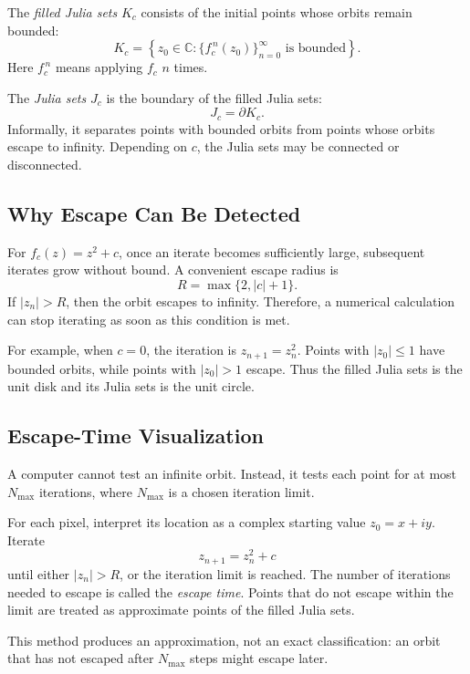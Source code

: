 \documentclass[a4paper, 10pt, onepage]{elegantbook}
\begin{document}
{The \emph{filled Julia sets} \(K_c\) consists of the initial points whose
orbits remain bounded:
\[
K_c=
\left\{z_0\in\mathbb{C}:
\bigl\{f_c^{\,n}(z_0)\bigr\}_{n=0}^{\infty}
\text{ is bounded}\right\}.
\]
Here \(f_c^{\,n}\) means applying \(f_c\) \(n\) times.

The \emph{Julia sets} \(J_c\) is the boundary of the filled Julia sets:
\[
J_c=\partial K_c.
\]
Informally, it separates points with bounded orbits from points whose
orbits escape to infinity. Depending on \(c\), the Julia sets may be
connected or disconnected.

\subsection{Why Escape Can Be Detected}

\noindent

For \(f_c(z)=z^2+c\), once an iterate becomes sufficiently large,
subsequent iterates grow without bound. A convenient escape radius is
\[
R=\max\{2,\lvert c\rvert+1\}.
\]
If \(\lvert z_n\rvert>R\), then the orbit escapes to infinity. Therefore,
a numerical calculation can stop iterating as soon as this condition is
met.

For example, when \(c=0\), the iteration is \(z_{n+1}=z_n^2\).
Points with \(\lvert z_0\rvert\leq 1\) have bounded orbits, while points
with \(\lvert z_0\rvert>1\) escape. Thus the filled Julia sets is the
unit disk and its Julia sets is the unit circle.

\subsection{Escape-Time Visualization}

A computer cannot test an infinite orbit. Instead, it tests each point
for at most \(N_{\max}\) iterations, where \(N_{\max}\) is a chosen
iteration limit.

For each pixel, interpret its location as a complex starting value
\(z_0=x+iy\). Iterate
\[
z_{n+1}=z_n^2+c
\]
until either \(\lvert z_n\rvert>R\), or the iteration limit is reached.
The number of iterations needed to escape is called the \emph{escape
time}. Points that do not escape within the limit are treated as
approximate points of the filled Julia sets.

This method produces an approximation, not an exact classification:
an orbit that has not escaped after \(N_{\max}\) steps might escape later.

}
\end{document}
